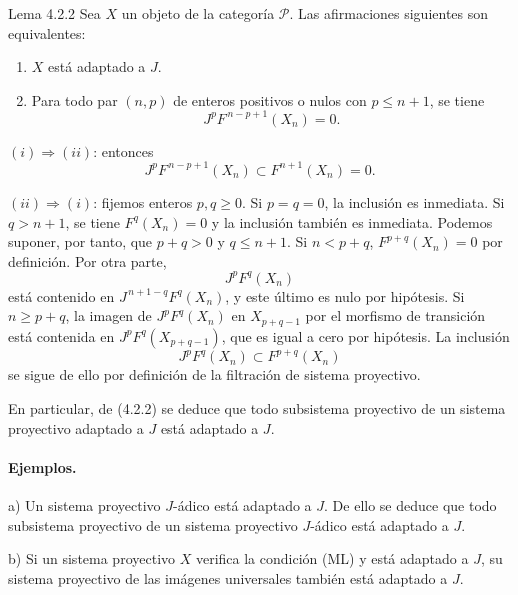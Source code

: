 \begin{statement}{Lema 4.2.2}
Sea \(X\) un objeto de la categoría \(\mathcal P\). Las afirmaciones siguientes son equivalentes:
\begin{enumerate}[label=\textup{(\roman*)}]
\item \(X\) está adaptado a \(J\).
\item Para todo par \((n,p)\) de enteros positivos o nulos con \(p\le n+1\), se tiene
\[
J^pF^{\,n-p+1}(X_n)=0 .
\]
\end{enumerate}
\end{statement}

\begin{prooftext}
\((i)\Rightarrow(ii)\): entonces
\[
J^pF^{\,n-p+1}(X_n)\subset F^{n+1}(X_n)=0.
\]

\((ii)\Rightarrow(i)\): fijemos enteros \(p,q\ge0\). Si \(p=q=0\), la inclusión es inmediata. Si \(q>n+1\), se tiene \(F^q(X_n)=0\) y la inclusión también es inmediata. Podemos suponer, por tanto, que \(p+q>0\) y \(q\le n+1\). Si \(n<p+q\), \(F^{p+q}(X_n)=0\) por definición. Por otra parte,
\[
J^pF^q(X_n)
\]
está contenido en \(J^{\,n+1-q}F^q(X_n)\), y este último es nulo por hipótesis. Si \(n\ge p+q\), la imagen de \(J^pF^q(X_n)\) en \(X_{p+q-1}\) por el morfismo de transición está contenida en \(J^pF^q(X_{p+q-1})\), que es igual a cero por hipótesis. La inclusión
\[
J^pF^q(X_n)\subset F^{p+q}(X_n)
\]
se sigue de ello por definición de la filtración de sistema proyectivo.

En particular, de (4.2.2) se deduce que todo subsistema proyectivo de un sistema proyectivo adaptado a \(J\) está adaptado a \(J\).
\end{prooftext}

\paragraph{Ejemplos.}
a) Un sistema proyectivo \(J\)-ádico está adaptado a \(J\). De ello se deduce que todo subsistema proyectivo de un sistema proyectivo \(J\)-ádico está adaptado a \(J\).

b) Si un sistema proyectivo \(X\) verifica la condición (ML) y está adaptado a \(J\), su sistema proyectivo de las imágenes universales también está adaptado a \(J\).
